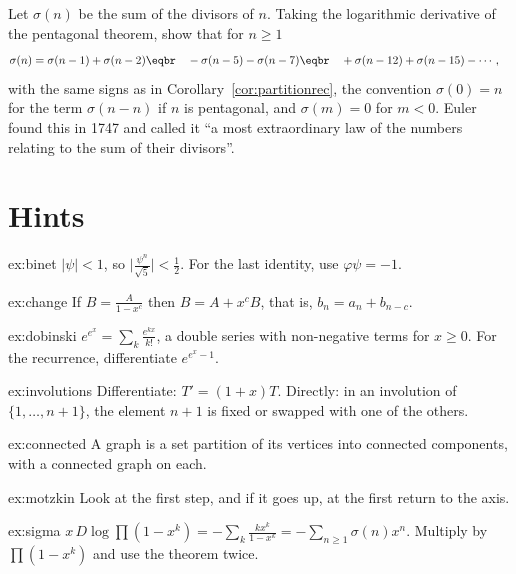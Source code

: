 \begin{exercise}[$\star\star\star$]\label{ex:sigma}
Let $\sigma(n)$ be the sum of the divisors of $n$. Taking the logarithmic derivative of the pentagonal theorem, show
that for $n\ge1$
\[
\begin{aligned}\sigma(n)&=\sigma(n-1)+\sigma(n-2)\eqbr\quad-\sigma(n-5)-\sigma(n-7)\eqbr\quad+\sigma(n-12)+\sigma(n-15)-\cdots,\end{aligned}
\]
with the same signs as in Corollary~\ref{cor:partitionrec}, the convention $\sigma(0)=n$ for the term $\sigma(n-n)$
if $n$ is pentagonal, and $\sigma(m)=0$ for $m<0$. Euler found this in 1747 and called it ``a most extraordinary law of the
numbers relating to the sum of their divisors''.
\end{exercise}

\section{Hints}

\begin{hint}{ex:binet}
$|\psi|<1$, so $\bigl|\frac{\psi^n}{\sqrt5}\bigr|<\frac12$. For the last identity, use $\varphi\psi=-1$.
\end{hint}
\begin{hint}{ex:change}
If $B=\frac A{1-x^c}$ then $B=A+x^cB$, that is, $b_n=a_n+b_{n-c}$.
\end{hint}
\begin{hint}{ex:dobinski}
$e^{e^x}=\sum_k\frac{e^{kx}}{k!}$, a double series with non-negative terms for $x\ge0$. For the recurrence, differentiate
$e^{e^x-1}$.
\end{hint}
\begin{hint}{ex:involutions}
Differentiate: $T'=(1+x)T$. Directly: in an involution of $\{1,\dots,n+1\}$, the element $n+1$ is fixed or swapped with one
of the others.
\end{hint}
\begin{hint}{ex:connected}
A graph is a set partition of its vertices into connected components, with a connected graph on each.
\end{hint}
\begin{hint}{ex:motzkin}
Look at the first step, and if it goes up, at the first return to the axis.
\end{hint}
\begin{hint}{ex:sigma}
$x\,D\log\prod(1-x^k)=-\sum_k\frac{kx^k}{1-x^k}=-\sum_{n\ge1}\sigma(n)x^n$. Multiply by $\prod(1-x^k)$ and use the theorem twice.
\end{hint}

